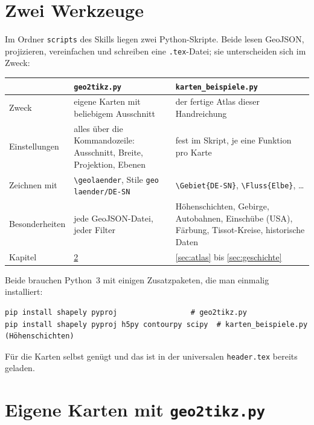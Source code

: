 \section{Zwei Werkzeuge}

Im Ordner \texttt{scripts} des Skills liegen zwei Python-Skripte. Beide lesen GeoJSON, projizieren, vereinfachen und schreiben eine \texttt{.tex}-Datei; sie unterscheiden sich im Zweck:

\begin{center}
\small
\begin{tabular}{@{}>{\raggedright\arraybackslash}p{3cm}>{\raggedright\arraybackslash}p{6.2cm}>{\raggedright\arraybackslash}p{6.2cm}@{}}
	\toprule
	& \textbf{\texttt{geo2tikz.py}} & \textbf{\texttt{karten\_beispiele.py}} \\
	\midrule
	Zweck & eigene Karten mit beliebigem Ausschnitt & der fertige Atlas dieser Handreichung \\
	Einstellungen & alles über die Kommandozeile: Ausschnitt, Breite, Projektion, Ebenen & fest im Skript, je eine Funktion pro Karte \\
	Zeichnen mit & \texttt{\textbackslash geolaender}, Stile \texttt{geo laender/DE-SN} & \texttt{\textbackslash Gebiet\{DE-SN\}}, \texttt{\textbackslash Fluss\{Elbe\}}, \dots \\
	Besonderheiten & jede GeoJSON-Datei, jeder Filter & Höhenschichten, Gebirge, Autobahnen, Einschübe (USA), Färbung, Tissot-Kreise, historische Daten \\
	Kapitel & \ref{sec:eigene} & \ref{sec:atlas} bis \ref{sec:geschichte} \\
	\bottomrule
\end{tabular}
\end{center}

Beide brauchen Python~3 mit einigen Zusatzpaketen, die man einmalig installiert:

\begin{lstlisting}[style=latex]
pip install shapely pyproj                 # geo2tikz.py
pip install shapely pyproj h5py contourpy scipy  # karten_beispiele.py (Höhenschichten)
\end{lstlisting}

Für die Karten selbst genügt \TikZ und das ist in der universalen \texttt{header.tex} bereits geladen.



\section{Eigene Karten mit \texttt{geo2tikz.py}}\label{sec:eigene}


